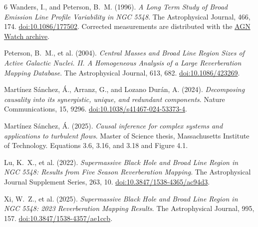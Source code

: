 \begingroup
\raggedright
\begin{thebibliography}{6}
Wanders, I., and Peterson, B.~M. (1996).
\textit{A Long Term Study of Broad Emission Line Profile Variability in
NGC 5548}. The Astrophysical Journal, 466, 174.
\href{https://doi.org/10.1086/177502}{doi:10.1086/177502}.
Corrected measurements are distributed with the
\href{https://www.asc.ohio-state.edu/astronomy/agnwatch/n5548/spectra/}{AGN Watch archive}.

Peterson, B.~M., et al. (2004).
\textit{Central Masses and Broad Line Region Sizes of Active Galactic
Nuclei. II. A Homogeneous Analysis of a Large Reverberation Mapping
Database}. The Astrophysical Journal, 613, 682.
\href{https://doi.org/10.1086/423269}{doi:10.1086/423269}.

Mart\'{i}nez S\'{a}nchez, \'{A}., Arranz, G., and Lozano Dur\'{a}n, A. (2024).
\textit{Decomposing causality into its synergistic, unique, and redundant
components}. Nature Communications, 15, 9296.
\href{https://doi.org/10.1038/s41467-024-53373-4}{doi:10.1038/s41467-024-53373-4}.

Mart\'{i}nez S\'{a}nchez, \'{A}. (2025).
\textit{Causal inference for complex systems and applications to turbulent
flows}. Master of Science thesis, Massachusetts Institute of Technology.
Equations 3.6, 3.16, and 3.18 and Figure 4.1.

Lu, K.~X., et al. (2022).
\textit{Supermassive Black Hole and Broad Line Region in NGC 5548:
Results from Five Season Reverberation Mapping}.
The Astrophysical Journal Supplement Series, 263, 10.
\href{https://doi.org/10.3847/1538-4365/ac94d3}{doi:10.3847/1538-4365/ac94d3}.

Xi, W.~Z., et al. (2025).
\textit{Supermassive Black Hole and Broad Line Region in NGC 5548:
2023 Reverberation Mapping Results}.
The Astrophysical Journal, 995, 157.
\href{https://doi.org/10.3847/1538-4357/ae1ccb}{doi:10.3847/1538-4357/ae1ccb}.
\end{thebibliography}
\endgroup
